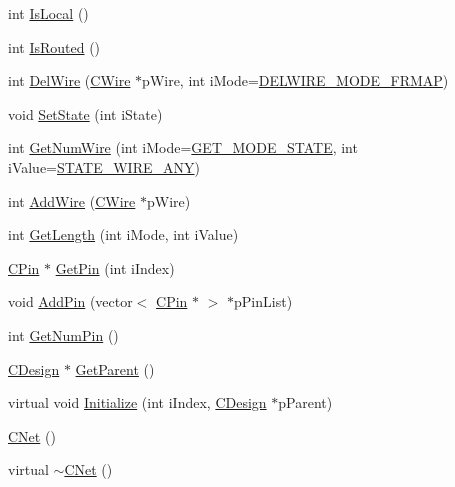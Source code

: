 \begin{DoxyCompactItemize}
\item 
int \mbox{\hyperlink{classCNet_a2d8665848d2b21b355753866f872af45}{Is\+Local}} ()
\item 
int \mbox{\hyperlink{classCNet_a0c25ee386b4a476bee6a6d86da9959d9}{Is\+Routed}} ()
\item 
int \mbox{\hyperlink{classCNet_a26f0aadddc16f2e5ec33a3b2e5f4e97a}{Del\+Wire}} (\mbox{\hyperlink{classCWire}{C\+Wire}} $\ast$p\+Wire, int i\+Mode=\mbox{\hyperlink{BoxRouter_8h_a2675adf9c4b7c477e4a85507b9a1f23a}{D\+E\+L\+W\+I\+R\+E\+\_\+\+M\+O\+D\+E\+\_\+\+F\+R\+M\+AP}})
\item 
void \mbox{\hyperlink{classCNet_adecbdeeb33f6ef0a4f9cada16ffac585}{Set\+State}} (int i\+State)
\item 
int \mbox{\hyperlink{classCNet_ae194cdbb585414b5eb533d0d097944b3}{Get\+Num\+Wire}} (int i\+Mode=\mbox{\hyperlink{BoxRouter_8h_a6f72f2cc9dd31793dd832ccfb2547de4}{G\+E\+T\+\_\+\+M\+O\+D\+E\+\_\+\+S\+T\+A\+TE}}, int i\+Value=\mbox{\hyperlink{BoxRouter_8h_a1b285251edd87e1423189470586cc719}{S\+T\+A\+T\+E\+\_\+\+W\+I\+R\+E\+\_\+\+A\+NY}})
\item 
int \mbox{\hyperlink{classCNet_a95e5735a7449f7d54fe97c335a65fccc}{Add\+Wire}} (\mbox{\hyperlink{classCWire}{C\+Wire}} $\ast$p\+Wire)
\item 
int \mbox{\hyperlink{classCNet_a8712e8f595e036e1e5c693100d071e38}{Get\+Length}} (int i\+Mode, int i\+Value)
\item 
\mbox{\hyperlink{classCPin}{C\+Pin}} $\ast$ \mbox{\hyperlink{classCNet_afa01af65ac2f23050bab801b844034ce}{Get\+Pin}} (int i\+Index)
\item 
void \mbox{\hyperlink{classCNet_a6fbe191b6e69b29fb54d409779caf776}{Add\+Pin}} (vector$<$ \mbox{\hyperlink{classCPin}{C\+Pin}} $\ast$ $>$ $\ast$p\+Pin\+List)
\item 
int \mbox{\hyperlink{classCNet_a709f7e9718fa62118a55d8def2fd4e41}{Get\+Num\+Pin}} ()
\item 
\mbox{\hyperlink{classCDesign}{C\+Design}} $\ast$ \mbox{\hyperlink{classCNet_a920188d5e3abdca198ad85d4299ea10d}{Get\+Parent}} ()
\item 
virtual void \mbox{\hyperlink{classCNet_aa9584e96f1e2aa7701ec11f40686db23}{Initialize}} (int i\+Index, \mbox{\hyperlink{classCDesign}{C\+Design}} $\ast$p\+Parent)
\item 
\mbox{\hyperlink{classCNet_aafe21b654acdaa4118d359766dc30d18}{C\+Net}} ()
\item 
virtual \mbox{\hyperlink{classCNet_a7cca1940642bf76e663685f011f20067}{$\sim$\+C\+Net}} ()
\end{DoxyCompactItemize}
